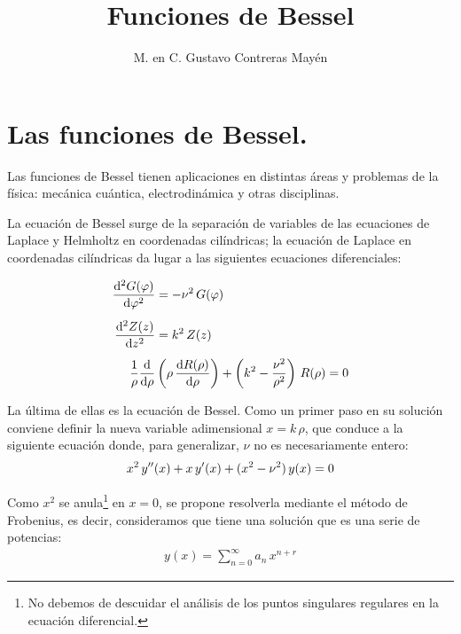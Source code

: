 
\title{Funciones de Bessel} \vspace{-3ex}
\author{M. en C. Gustavo Contreras Mayén}
\date{ }
\newcommand{\Cancel}[2][black]{{\color{#1}\cancel{\color{black}#2}}}

\vspace{-4cm}
\maketitle
\fontsize{14}{14}\selectfont
\tableofcontents
\newpage

\section{Las funciones de Bessel.}

Las funciones de Bessel tienen aplicaciones en distintas áreas y problemas de la física: mecánica cuántica, electrodinámica y otras disciplinas.
\par
La ecuación de Bessel surge de la separación de variables de las ecuaciones de Laplace y Helmholtz en coordenadas cilíndricas; la ecuación de Laplace en coordenadas cilíndricas da lugar a las siguientes ecuaciones diferenciales:

\begin{align}
\begin{aligned}
\dv[2]{G(\varphi)}{\varphi} &= - \nu^{2} \, G(\varphi) \\[0.5em]
\dv[2]{Z(z)}{z} &= k^{2} \, Z(z) \\[0.5em]
\dfrac{1}{\rho} \dv{}{\rho} &\left( \rho \, \dv{R(\rho)}{\rho} \right) + \left( k^{2} - \dfrac{\nu^{2}}{\rho^{2}} \right) \, R(\rho) = 0
\end{aligned}
\label{eq:ecuacion_08_02} 
\end{align}

La última de ellas es la ecuación de Bessel. Como un primer paso en su solución conviene definir la nueva variable adimensional $ x = k \, \rho$, que conduce a la siguiente ecuación donde, para generalizar, $\nu$ no es necesariamente entero:
\begin{align}
x^{2} \, {y}^{\prime \prime} (x) +  x \, {y}^{\prime} (x) +  (x^{2} - \nu^{2}) \, y(x) = 0
\label{eq:ecuacion_08_03}
\end{align}

Como $x^{2}$ se anula\footnote{No debemos de descuidar el análisis de los puntos singulares regulares en la ecuación diferencial.} en $x = 0$, se propone resolverla mediante el método de Frobenius, es decir, consideramos que tiene una solución que es una serie de potencias: 
\begin{align*}
y(x) = \sum_{n=0}^{\infty} a_{n} \, x^{n + r}
\end{align*}

